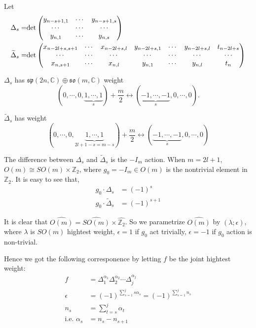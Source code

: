 \documentclass[12pt]{article}
\def\bZ{{\mathbb{Z}}}
\def\bC{{\mathbb{C}}}
\def\det{{\rm det}}
\def\tDelta{\widetilde{\Delta}}
\def\aso{\mathfrak{so}}
\def\asp{\mathfrak{sp}}
\begin{document}
Let 
\begin{align*}
\Delta_s =& \det\begin{pmatrix}
y_{n-s+1,1} & \cdots & y_{n-s+1, s} \\
\cdots & \cdots & \cdots \\
y_{n,1} & \cdots & y_{n,s}
\end{pmatrix}\\
\tDelta_s = & \det\begin{pmatrix}
x_{n-2l+s, s+1} & \cdots & x_{n-2l+s,l} & y_{n-2l+s,1} & \cdots & y_{n-2l+s,l}&t_{n-2l+s}\\
\cdots&\cdots&\cdots&\cdots&\cdots&\cdots &\cdots \\
x_{n, s+1} & \cdots & x_{n,l} & y_{n,1} & \cdots & y_{n,l}& t_n
\end{pmatrix}
\end{align*}

$\Delta_s$ has $\asp(2n,\bC)\oplus \aso(m,\bC)$ weight 
\[
(0, \cdots, 0, \underbrace{1, \cdots, 1}_s)+\frac{m}{2}
\leftrightarrow
(\underbrace{-1,\cdots, -1}_s, 0,\cdots, 0) .
\]

$\tDelta_s$ has weight
\[
(0, \cdots, 0, \underbrace{1,\cdots, 1}_{2l+1-s=m-s})+\frac{m}{2}
\leftrightarrow (\underbrace{-1,\cdots, -1}_s, 0,\cdots, 0)
\]

The difference between $\Delta_s$ and $\tDelta_s$ is the $-I_m$ action.
When $m=2l+1$, $O(m) \cong SO(m)\times \bZ_2$, where $g_0=-I_m\in O(m)$ 
is the nontrivial element in $\bZ_2$. It is easy to see that, 
\begin{align*}
g_0\cdot \Delta_s &= (-1)^s\\
g_0\cdot \tDelta_s & = (-1)^{s+1}
\end{align*}

It is clear that $\widehat{O(m)} = \widehat{SO(m)}\times \widehat{\bZ_2}$. 
So we parametrize $\widehat{O(m)}$ by $(\lambda; \epsilon)$, where $\lambda$
is $SO(m)$ hightest weight, $\epsilon=1$ if $g_0$ act trivially, $\epsilon=-1$
if $g_0$ action is non-trivial.   

Hence we got the following corresponence by letting $f$ be the joint hightest weight:
\begin{align*}
f &= \Delta_1^{\alpha_1}\Delta_2^{\alpha_2} \cdots \Delta_j^{\alpha_j}\\
\epsilon &= (-1)^{\sum_{s=1}^j s\alpha_s} = (-1)^{\sum_{s=1}^jn_s}\\
n_s &= \sum_{t=s}^j \alpha_t\\
\text{i.e. } \alpha_s &= n_s-n_{s+1}
\end{align*}
\end{document}

